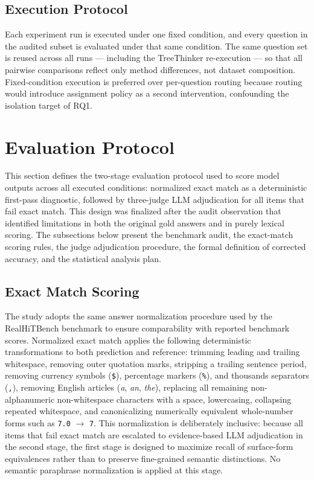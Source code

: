 ﻿\documentclass[a4paper]{article}
\begin{document}
\subsection{Execution Protocol}

Each experiment run is executed under one fixed condition, and 
every question in the audited subset is evaluated under that same 
condition. The same question set is reused across all runs --- 
including the TreeThinker re-execution --- so that all pairwise 
comparisons reflect only method differences, not dataset 
composition. Fixed-condition execution is preferred over 
per-question routing because routing would introduce assignment 
policy as a second intervention, confounding the isolation target 
of RQ1.

\section{Evaluation Protocol}
\label{sec:evaluation}

This section defines the two-stage evaluation protocol used to score model outputs across all executed conditions: normalized exact match as a deterministic first-pass diagnostic, followed by three-judge LLM adjudication for all items that fail exact match. This design was finalized after the audit observation that identified limitations in both the original gold answers and in purely lexical scoring. The subsections below present the benchmark audit, the exact-match scoring rules, the judge adjudication procedure, the formal definition of corrected accuracy, and the statistical analysis plan.

\subsection{Exact Match Scoring}

The study adopts the same answer normalization procedure used by the RealHiTBench benchmark to ensure comparability with reported benchmark scores. Normalized exact match applies the following deterministic transformations to both prediction and reference: trimming leading and trailing whitespace, removing outer quotation marks, stripping a trailing sentence period, removing currency symbols (\texttt{\$}), percentage markers (\texttt{\%}), and thousands separators (\texttt{,}), removing English articles (\textit{a}, \textit{an}, \textit{the}), replacing all remaining non-alphanumeric non-whitespace characters with a space, lowercasing, collapsing repeated whitespace, and canonicalizing numerically equivalent whole-number forms such as \texttt{7.0} $\to$ \texttt{7}. This normalization is deliberately inclusive: because all items that fail exact match are escalated to evidence-based LLM adjudication in the second stage, the first stage is designed to maximize recall of surface-form equivalences rather than to preserve fine-grained semantic distinctions. No semantic paraphrase normalization is applied at this stage.
\end{document}
